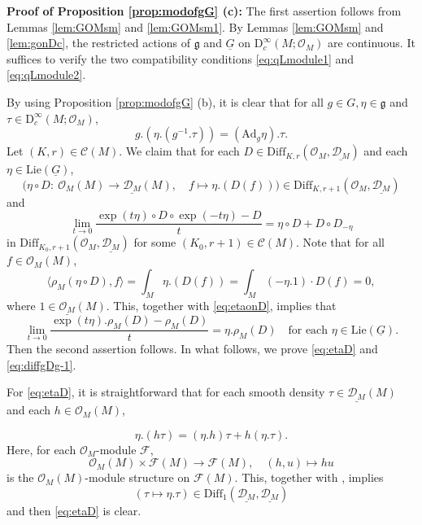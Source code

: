 \documentclass[12pt, a4paper]{amsart}
\newcommand{\CF}{{\mathcal {F}}}
\newcommand{\CO}{{\mathcal {O}}}
\newcommand{\RD}{{\mathrm {D}}}
\newcommand{\Ad}{{\mathrm{Ad}}}
\newcommand{\Lie}{{\mathrm{Lie}}}
\newcommand{\g}{\mathfrak g}
\newcommand{\la}{\langle}
\newcommand{\ra}{\rangle}
\newcommand{\be}{\begin {equation}}
\newcommand{\ee}{\end {equation}}
\theoremstyle{Theorem}
\theoremstyle{Theorem}
\theoremstyle{Theorem}
\theoremstyle{Theorem}
\theoremstyle{Plain}
\theoremstyle{remark}
\theoremstyle{remark}
\theoremstyle{Definition}
\numberwithin{equation}{section}
\begin{document}
\noindent\textbf{Proof of Proposition \ref{prop:modofgG} (c):} 
The first assertion follows from Lemmas \ref{lem:GOMsm} and \ref{lem:GOMsm1}. 
By Lemmas \ref{lem:GOMsm} and \ref{lem:gonDc}, the restricted actions of $\g$ and 
$\underline G$ on 
$\RD^\infty_c(M;\CO_M)$ are continuous. It suffices to verify the two compatibility conditions \eqref{eq:qLmodule1} and \eqref{eq:qLmodule2}.

By using  
Proposition \ref{prop:modofgG} (b), it is clear that 
for all $g\in G, \eta \in \g$ and $\tau\in \RD^{\infty}_c(M;\CO_M)$, \[ g.(\eta.(g^{-1}.\tau))=(\Ad_g \eta).\tau.\]
Let $(K,r)\in \mathcal{C}(M)$. 
We claim that for each $D\in \mathrm{Diff}_{K,r}(\CO_M,\underline{\mathcal{D}_M})$ and each $\eta\in \Lie(\underline{ G})$, 
\be\label{eq:etaD}\text{$\big(\eta\circ D:\ \CO_M(M)\rightarrow \underline{\mathcal{D}_M}(M),\quad f\mapsto \eta.(D(f))\big)\in \mathrm{Diff}_{K,r+1}(\CO_{M},\underline{\mathcal{D}_M})$}\ee
and 
\be\label{eq:diffgDg-1} \lim_{t\rightarrow 0} \frac{\exp(t\eta)\circ D\circ \exp(-t\eta)-D}{t}=\eta\circ D+D\circ D_{-\eta}\ee
in $\mathrm{Diff}_{K_0,r+1}(\CO_M,\underline{\mathcal{D}_M})$ for some $(K_0,r+1)\in \mathcal{C}(M)$. 
Note that for all $f\in \CO_M(M)$, 
\[ \la \rho_M(\eta\circ D),f\ra =\int_M \eta.(D(f))=\int_M (-\eta.1)\cdot D(f)=0,\]where $1\in \underline{\CO_M}(M)$.
This, together with  \eqref{eq:etaonD}, implies that 
 \[\lim_{t\rightarrow 0}\frac{\exp(t\eta).\rho_M(D)-\rho_M(D)}{t} =\eta.\rho_M(D)\quad \text{for each $\eta\in \Lie(\underline{ G})$}.\] Then the second assertion follows. In what follows, we prove \eqref{eq:etaD} and \eqref{eq:diffgDg-1}.

For \eqref{eq:etaD}, it is straightforward  that for each smooth density $\tau\in\underline{\mathcal{D}_M}(M)$ and each $h\in \CO_M(M)$,

\[\eta.(h\tau)=(\eta.h)\tau+h(\eta.\tau).\]
Here, for each $\CO_M$-module $\CF$, \[\CO_{M}(M)\times \CF(M)\rightarrow \CF(M), \quad (h,u)\mapsto hu\]
is the $\CO_M(M)$-module structure on $\CF(M)$. 
This, together with \cite[Proposition 3.8]{CSW1}, implies 
\[(\tau\mapsto \eta.\tau)\in \mathrm{Diff}_1(\underline{\mathcal{D}_M},\underline{\mathcal{D}_M})\] and then  \eqref{eq:etaD} is clear.
\end{document}
